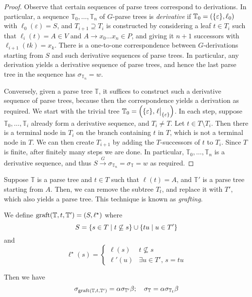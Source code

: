 \begin{proof}
	Observe that certain sequences of parse trees correspond to derivations.
	In particular, a sequence \( \mathbb T_0, \dots, \mathbb T_n \) of \( G \)-parse trees is \emph{derivative} if \( \mathbb T_0 = (\qty{\varepsilon}, \ell_0) \) with \( \ell_0(\varepsilon) = S \), and \( T_{i+1} \supseteq T_i \) is constructed by considering a leaf \( t \in T_i \) such that \( \ell_i(t) = A \in V \) and \( A \to x_0 \dots x_n \in P \), and giving it \( n + 1 \) successors with \( \ell_{i+1}(tk) = x_k \).
	There is a one-to-one correspondence between \( G \)-derivations starting from \( S \) and such derivative sequences of parse trees.
	In particular, any derivation yields a derivative sequence of parse trees, and hence the last parse tree in the sequence has \( \sigma_{\mathbb T_n} = w \).

	Conversely, given a parse tree \( \mathbb T \), it suffices to construct such a derivative sequence of parse trees, because then the correspondence yields a derivation as required.
	We start with the trivial tree \( \mathbb T_0 = \qty(\qty{\varepsilon}, \eval{\ell}_{\qty{\varepsilon}}) \).
	In each step, suppose \( \mathbb T_0, \dots, \mathbb T_i \) already form a derivative sequence, and \( T_i \neq T \).
	Let \( t \in T \setminus T_i \).
	Then there is a terminal node in \( T_i \) on the branch containing \( t \) in \( T \), which is not a terminal node in \( T \).
	We can then create \( T_{i+1} \) by adding the \( T \)-successors of \( t \) to \( T_i \).
	Since \( T \) is finite, after finitely many steps we are done.
	In particular, \( \mathbb T_0, \dots, \mathbb T_n \) is a derivative sequence, and thus \( S \xrightarrow G \sigma_{\mathbb T_n} = \sigma_{\mathbb T} = w \) as required.
\end{proof}
Suppose \( \mathbb T \) is a parse tree and \( t \in T \) such that \( \ell(t) = A \), and \( \mathbb T' \) is a parse tree starting from \( A \).
Then, we can remove the subtree \( T_t \), and replace it with \( T' \), which also yields a parse tree.
This technique is known as \emph{grafting}.
\begin{definition}
	We define \( \operatorname{graft}(\mathbb T, t, \mathbb T') = (S, \ell^\star) \) where
	\[ S = \qty{s \in T \mid t \not\subseteq s} \cup \qty{tu \mid u \in T'} \]
	and
	\[ \ell^\star(s) = \begin{cases}
		\ell(s) & t \not\subseteq s \\
		\ell'(u) & \exists u \in T',\, s = tu
	\end{cases} \]
\end{definition}
Then we have
\[ \sigma_{\operatorname{graft}(\mathbb T, t, \mathbb T')} = \alpha \sigma_{\mathbb T'} \beta;\quad \sigma_{\mathbb T} = \alpha \sigma_{\mathbb T_t} \beta \]

